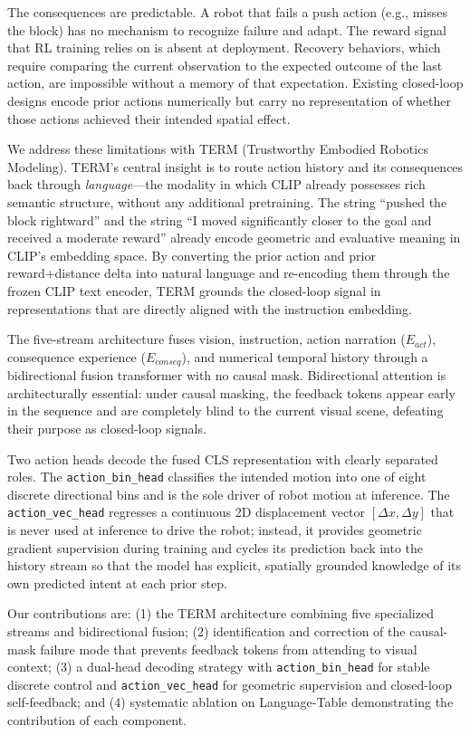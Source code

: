 \documentclass[letterpaper]{article} %
\begin{document}
The consequences are predictable. A robot that fails a push action (e.g., misses the block) has no mechanism to recognize failure and adapt. The reward signal that RL training relies on is absent at deployment. Recovery behaviors, which require comparing the current observation to the expected outcome of the last action, are impossible without a memory of that expectation. Existing closed-loop designs \cite{hejna2025pi05,durante2024agent} encode prior actions numerically but carry no representation of whether those actions achieved their intended spatial effect.

We address these limitations with TERM (Trustworthy Embodied Robotics Modeling). TERM's central insight is to route action history and its consequences back through \emph{language}---the modality in which CLIP \cite{radford2021clip} already possesses rich semantic structure, without any additional pretraining. The string ``pushed the block rightward'' and the string ``I moved significantly closer to the goal and received a moderate reward'' already encode geometric and evaluative meaning in CLIP's embedding space. By converting the prior action and prior reward+distance delta into natural language and re-encoding them through the frozen CLIP text encoder, TERM grounds the closed-loop signal in representations that are directly aligned with the instruction embedding.

The five-stream architecture fuses vision, instruction, action narration ($E_{act}$), consequence experience ($E_{conseq}$), and numerical temporal history through a bidirectional fusion transformer with no causal mask. Bidirectional attention is architecturally essential: under causal masking, the feedback tokens appear early in the sequence and are completely blind to the current visual scene, defeating their purpose as closed-loop signals.

Two action heads decode the fused CLS representation with clearly separated roles. The \texttt{action\_bin\_head} classifies the intended motion into one of eight discrete directional bins and is the sole driver of robot motion at inference. The \texttt{action\_vec\_head} regresses a continuous 2D displacement vector $[\Delta x, \Delta y]$ that is never used at inference to drive the robot; instead, it provides geometric gradient supervision during training and cycles its prediction back into the history stream so that the model has explicit, spatially grounded knowledge of its own predicted intent at each prior step.

Our contributions are: (1) the TERM architecture combining five specialized streams and bidirectional fusion; (2) identification and correction of the causal-mask failure mode that prevents feedback tokens from attending to visual context; (3) a dual-head decoding strategy with \texttt{action\_bin\_head} for stable discrete control and \texttt{action\_vec\_head} for geometric supervision and closed-loop self-feedback; and (4) systematic ablation on Language-Table demonstrating the contribution of each component.
\end{document}
